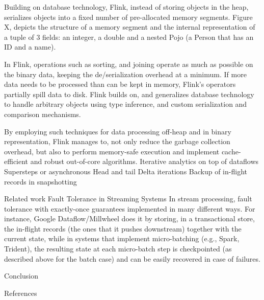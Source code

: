 \documentclass{sig-alternate}
\begin{document}
Building on database technology, Flink, instead of storing objects in the heap, serializes objects into a fixed number of pre-allocated memory segments. Figure X, depicts the structure of a memory segment and the internal representation of a tuple of 3 fields: an integer, a double and a nested Pojo (a Person that has an ID and a name).

In Flink, operations such as sorting, and joining operate as much as possible on the binary data, keeping the de/serialization overhead at a minimum. If more data needs to be processed than can be kept in memory, Flink’s operators partially spill data to disk. Flink builds on, and generalizes database technology to handle arbitrary objects using type inference, and  custom serialization and comparison mechanisms. 

By employing such techniques for data processing off-heap and in binary representation, Flink manages to, not only reduce the garbage collection overhead, but also to perform memory-safe execution and implement cache-efficient and robust out-of-core algorithms.
Iterative analytics on top of dataflows
Supersteps or asynchronous
Head and tail
Delta iterations
Backup of in-flight records in snapshotting

Related work
Fault Tolerance in Streaming Systems
In stream processing, fault tolerance with exactly-once guarantees implemented in many different ways. For instance, Google Dataflow/Millwheel does it by storing, in a transactional store, the in-flight records (the ones that it pushes downstream) together with the current state, while in systems that implement micro-batching (e.g., Spark, Trident), the resulting state at each micro-batch step is checkpointed (as described above for the batch case) and can be easily recovered in case of failures.



Conclusion

References




\cite{DBLP:conf/hotcloud/ZahariaCFSS10}




\end{document}
